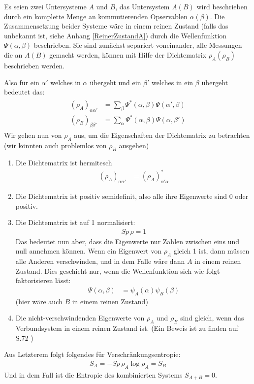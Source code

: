 \documentclass[ngerman]{scrartcl}
\begin{document}
Es seien zwei Untersysteme $A$ und $B$, das Untersystem $A(B)$ wird beschrieben durch ein komplette Menge an kommutierenden Opservablen $\alpha(\beta)$. Die Zusammensetzung beider Systeme wäre in einem reinen Zustand (falls das unbekannt ist, siehe Anhang \ref{ReinerZustandA}) durch die Wellenfunktion $\Psi(\alpha,\beta)$ beschrieben. Sie sind zunächst separiert voneinander, alle Messungen die an $A(B)$ gemacht werden, können mit Hilfe der Dichtematrix $\rho_A(\rho_B)$ beschrieben werden.
	
Also für ein $\alpha'$ welches in $\alpha$ übergeht und ein $\beta'$ welches in ein $\beta$ übergeht bedeutet das:
	\begin{align}
		\begin{aligned}
		(\rho_A)_{\alpha \alpha'} &=
		\sum_{\beta} \Psi^*(\alpha, \beta) \Psi(\alpha', \beta) \\
		(\rho_B)_{\beta \beta'} &= 
		\sum_{\alpha} \Psi^* (\alpha, \beta) \Psi (\alpha, \beta')
		\end{aligned}
	\end{align}
Wir gehen nun von $\rho_A$ aus, um die Eigenschaften der Dichtematrix zu betrachten (wir könnten auch problemlos von $\rho_B$ ausgehen)
	\begin{enumerate}[1)]
	\item Die Dichtematrix ist hermitesch
		\begin{align}
			(\rho_A)_{\alpha \alpha'} &= (\rho_A)^*_{\alpha' \alpha}
		\end{align}
	\item Die Dichtematrix ist positiv semidefinit, also alle ihre Eigenwerte sind 0 oder positiv.
	\item Die Dichtematrix ist auf 1 normalisiert:
		\begin{align}
			Sp \, \rho = 1
		\end{align}
	Das bedeutet nun aber, dass die Eigenwerte nur Zahlen zwischen eins und null annehmen können. Wenn ein Eigenwert von $\rho_A$ gleich 1 ist, dann müssen alle Anderen verschwinden, und in dem Falle wäre dann $A$ in einem reinen Zustand. 
	Dies geschieht nur, wenn die Wellenfunktion sich wie folgt faktorisieren lässt:
		\begin{align}
			\Psi (\alpha, \beta) &= \psi_A(\alpha) \psi_B (\beta)
		\end{align} 
	(hier wäre auch $B$ in einem reinen Zustand)
	\item Die nicht-verschwindenden Eigenwerte von $\rho_A$ und $\rho_B$ sind gleich, wenn das Verbundsystem in einem reinen Zustand ist. (Ein Beweis ist zu finden auf S.72 \cite{Revolution})
	\end{enumerate}
Aus Letzterem folgt folgendes für Verschränkungsentropie:
	\begin{align}
		S_A = -Sp \, \rho_A \log \rho_A = S_B
	\end{align}
Und in dem Fall ist die Entropie des kombinierten Systems $S_{A+B} = 0$.
\end{document}
